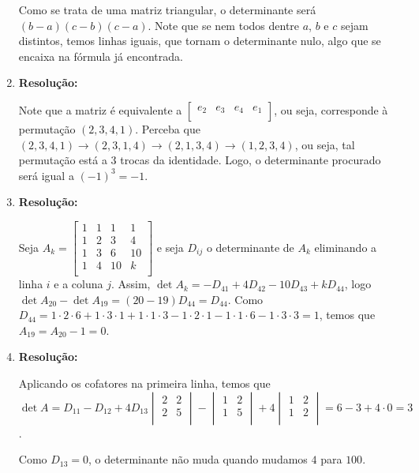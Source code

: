 \documentclass[leqno]{article}
\begin{document}
\begin{enumerate}
    Como se trata de uma matriz triangular, o determinante será $(b-a)(c-b)(c-a)$. Note que se nem todos dentre $a$, $b$ e $c$ sejam distintos, temos linhas iguais, que tornam o determinante nulo, algo que se encaixa na fórmula já encontrada.
    
    \item 
    
    \textbf{Resolução:}
    
    Note que a matriz é equivalente a $\begin{bmatrix}
        e_2 & e_3 & e_4 & e_1\\
    \end{bmatrix}$, ou seja, corresponde à permutação $(2,3,4,1)$. Perceba que $(2,3,4,1)\rightarrow(2,3,1,4)\rightarrow(2,1,3,4)\rightarrow(1,2,3,4)$, ou seja, tal permutação está a 3 trocas da identidade. Logo, o determinante procurado será igual a $(-1)^3=-1$.
    
    \item 
    
    \textbf{Resolução:}
    
    Seja $A_k=\begin{bmatrix}
        1 & 1 & 1 & 1\\
        1 & 2 & 3 & 4\\
        1 & 3 & 6 & 10\\
        1 & 4 & 10 & k\\
    \end{bmatrix}$ e seja $D_{ij}$ o determinante de $A_k$ eliminando a linha $i$ e a coluna $j$. Assim, $\det A_k=-D_{41}+4D_{42}-10D_{43}+kD_{44}$, logo $\det A_{20}-\det A_{19}=(20-19)D_{44}=D_{44}$. Como $D_{44}=1\cdot2\cdot6+1\cdot3\cdot1+1\cdot1\cdot3-1\cdot2\cdot1-1\cdot1\cdot6-1\cdot3\cdot3=1$, temos que $A_{19}=A_{20}-1=0$.
    
    \item 
    
    \textbf{Resolução:}
    
    Aplicando os cofatores na primeira linha, temos que $\det A=D_{11}-D_{12}+4D_{13}\begin{vmatrix}
        2 & 2\\
        2 & 5\\
    \end{vmatrix}-\begin{vmatrix}
        1 & 2\\
        1 & 5\\
    \end{vmatrix}+4\begin{vmatrix}
        1 & 2\\
        1 & 2\\
    \end{vmatrix}=6-3+4\cdot0=3$.
    
    Como $D_{13}=0$, o determinante não muda quando mudamos $4$ para $100$.
    
\end{enumerate}

 
\end{document}
